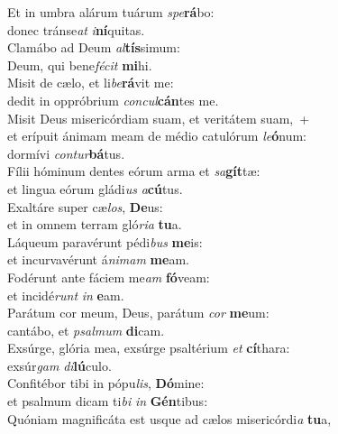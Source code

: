 \evenverse Et in umbra alárum tuárum \textit{spe}\textbf{rá}bo:~\*\\
\evenverse donec tránse\textit{at} \textit{i}\textbf{ní}quitas.\\
\oddverse Clamábo ad Deum \textit{al}\textbf{tís}simum:~\*\\
\oddverse Deum, qui bene\textit{fé}\textit{cit} \textbf{mi}hi.\\
\evenverse Misit de cælo, et li\textit{be}\textbf{rá}vit me:~\*\\
\evenverse dedit in oppróbrium \textit{con}\textit{cul}\textbf{cán}tes me.\\
\oddverse Misit Deus misericórdiam suam, et veritátem suam,~+\\
\oddverse  et erípuit ánimam meam de médio catulórum \textit{le}\textbf{ó}num:~\*\\
\oddverse dormívi \textit{con}\textit{tur}\textbf{bá}tus.\\
\evenverse Fílii hóminum dentes eórum arma et \textit{sa}\textbf{gít}tæ:~\*\\
\evenverse et lingua eórum gládi\textit{us} \textit{a}\textbf{cú}tus.\\
\oddverse Exaltáre super cæ\textit{los}, \textbf{De}us:~\*\\
\oddverse et in omnem terram gló\textit{ri}\textit{a} \textbf{tu}a.\\
\evenverse Láqueum paravérunt pédi\textit{bus} \textbf{me}is:~\*\\
\evenverse et incurvavérunt á\textit{ni}\textit{mam} \textbf{me}am.\\
\oddverse Fodérunt ante fáciem me\textit{am} \textbf{fó}veam:~\*\\
\oddverse et incidé\textit{runt} \textit{in} \textbf{e}am.\\
\evenverse Parátum cor meum, Deus, parátum \textit{cor} \textbf{me}um:~\*\\
\evenverse cantábo, et \textit{psal}\textit{mum} \textbf{di}cam.\\
\oddverse Exsúrge, glória mea, exsúrge psaltérium \textit{et} \textbf{cí}thara:~\*\\
\oddverse exsúr\textit{gam} \textit{di}\textbf{lú}culo.\\
\evenverse Confitébor tibi in pópu\textit{lis}, \textbf{Dó}mine:~\*\\
\evenverse et psalmum dicam ti\textit{bi} \textit{in} \textbf{Gén}tibus:\\
\oddverse Quóniam magnificáta est usque ad cælos misericórdi\textit{a} \textbf{tu}a,~\*\\
